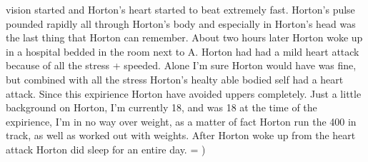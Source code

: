 \documentclass[12pt]{book}
\begin{document}
vision started and Horton's heart started to beat extremely fast. Horton's pulse pounded rapidly all through Horton's body and especially in Horton's head was the last thing that Horton can remember. About two hours later Horton woke up in a hospital bedded in the room next to A. Horton had had a mild heart attack because of all the stress + speeded. Alone I'm sure Horton would have was fine, but combined with all the stress Horton's healty able bodied self had a heart attack. Since this expirience Horton have avoided uppers completely. Just a little background on Horton, I'm currently 18, and was 18 at the time of the expirience, I'm in no way over weight, as a matter of fact Horton run the 400 in track, as well as worked out with weights. After Horton woke up from the heart attack Horton did sleep for an entire day. = )
\end{document}
